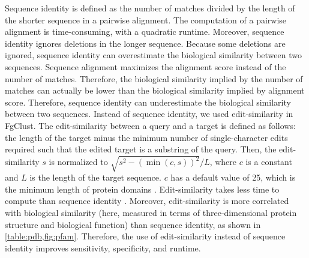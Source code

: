 \documentclass[11pt,letterpaper]{article}
\begin{document}
Sequence identity is defined as the number of matches divided by the length of the shorter sequence in a pairwise alignment.
The computation of a pairwise alignment is time-consuming, with a quadratic runtime. 
Moreover, sequence identity ignores deletions in the longer sequence.
Because some deletions are ignored, sequence identity can overestimate the biological similarity between two sequences.
Sequence alignment maximizes the alignment score instead of the number of matches.
Therefore, the biological similarity implied by the number of matches can actually be lower than the biological similarity implied by alignment score.
Therefore, sequence identity can underestimate the biological similarity between two sequences.
Instead of sequence identity, we used edit-similarity in FgClust.
The edit-similarity between a query and a target is defined as follows: 
	the length of the target minus the minimum number of single-character edits required such that the edited target is a substring of the query.
Then, the edit-similarity \(s\) is normalized to \(\sqrt{ s^2-(\min(c,s))^2}/L\), where \(c\) is a constant and \(L\) is the length of the target sequence.
\(c\) has a default value of 25, which is the minimum length of protein domains \citep[page 8]{niazi2016biosimilars}.
Edit-similarity takes less time to compute than sequence identity \citep{vsovsic2017edlib}.
Moreover, edit-similarity is more correlated with biological similarity (here, measured in terms of three-dimensional protein structure and biological function) than sequence identity, as shown in \cref{table:pdb,fig:pfam}.
Therefore, the use of edit-similarity instead of sequence identity improves sensitivity, specificity, and runtime.
\label{para:edsim}
\end{document}
